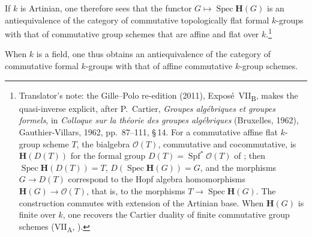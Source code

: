 If \(k\) is Artinian, one therefore sees that the functor
\(G\mapsto\operatorname{Spec}\mathbf H(G)\) is an antiequivalence of the
category of commutative topologically flat formal \(k\)-groups with that
of commutative group schemes that are affine and flat over \(k\).\footnote{Translator's note: the Gille--Polo re-edition (2011),
Exposé~VII\textsubscript{B}, makes the quasi-inverse explicit, after
P.~Cartier, \emph{Groupes algébriques et groupes formels}, in
\emph{Colloque sur la théorie des groupes algébriques} (Bruxelles, 1962),
Gauthier-Villars, 1962, pp.~87--111, \S\,14. For a commutative affine flat
\(k\)-group scheme \(T\), the bialgebra \(\mathcal O(T)\), commutative and
cocommutative, is \(\mathbf H(D(T))\) for the formal group
\(D(T)=\operatorname{Spf}^*\mathcal O(T)\) of ; then
\(\operatorname{Spec}\mathbf H(D(T))=T\),
\(D(\operatorname{Spec}\mathbf H(G))=G\), and the morphisms \(G\to D(T)\)
correspond to the Hopf algebra homomorphisms \(\mathbf H(G)\to\mathcal O(T)\),
that is, to the morphisms \(T\to\operatorname{Spec}\mathbf H(G)\). The
construction commutes with extension of the Artinian base. When
\(\mathbf H(G)\) is finite over \(k\), one recovers the Cartier duality of
finite commutative group schemes \textup{(VII\textsubscript{A}, )}.}

When \(k\) is a field, one thus obtains an antiequivalence of the
category of commutative formal \(k\)-groups with that of affine
commutative \(k\)-group schemes.
